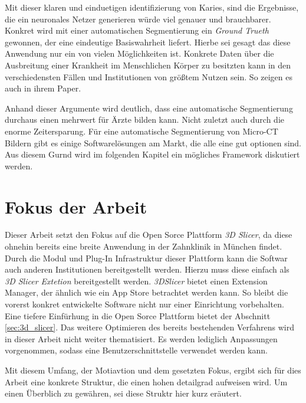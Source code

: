 Mit dieser klaren und einduetigen identifizierung von Karies, sind die
Ergebnisse, die ein neuronales Netzer generieren würde viel genauer und brauchbarer.
Konkret wird mit einer automatischen Segmentierung ein \textit{Ground Trueth} gewonnen,
der eine eindeutige Basiswahrheit liefert. Hierbe sei gesagt das diese Anwendung
nur ein von vielen Möglichkeiten ist. Konkrete Daten über die Ausbreitung einer
Krankheit im Menschlichen Körper zu besitzten kann in den verschiedensten Fällen
und Institutionen von größtem Nutzen sein. So zeigen es auch \citet{de20083d} in
ihrem Paper.

Anhand dieser Argumente wird deutlich, dass eine automatische Segmentierung durchaus
einen mehrwert für Ärzte bilden kann. Nicht zuletzt auch durch die enorme
Zeitersparung. Für eine automatische Segmentierung von Micro-CT Bildern gibt es einige
Softwarelösungen am Markt, die alle eine gut optionen sind. Aus diesem Gurnd wird
im folgenden Kapitel ein mögliches Framework diskutiert werden.

\section{Fokus der Arbeit}
\label{sec:fokus_der-arbeit} Dieser Arbeit setzt den Fokus auf die Open Sorce Plattform
\textit{3D Slicer}, da diese ohnehin bereits eine breite Anwendung in der Zahnklinik
in München findet. Durch die Modul und Plug-In Infrastruktur dieser Plattform
kann die Softwar auch anderen Institutionen bereitgestellt werden. Hierzu muss diese
einfach als \textit{3D Slicer Extetion} bereitgestellt werden. \textit{3DSlicer}
bietet einen Extension Manager, der ähnlich wie ein App Store betrachtet werden kann.
So bleibt die vorerst konkret entwickelte Software nicht nur einer Einrichtung
vorbehalten. Eine tiefere Einfürhung in die Open Sorce Plattform bietet der Abschnitt
\ref{sec:3d_slicer}. Das weitere Optimieren des bereits bestehenden Verfahrens
wird in dieser Arbeit nicht weiter thematisiert. Es werden lediglich Anpassungen
vorgenommen, sodass eine Benutzerschnittstelle verwendet werden kann.

Mit diesem Umfang, der Motiavtion und dem gesetzten Fokus, ergibt sich für dies
Arbeit eine konkrete Struktur, die einen hohen detailgrad aufweisen wird. Um
einen Überblich zu gewähren, sei diese Struktr hier kurz eräutert.

